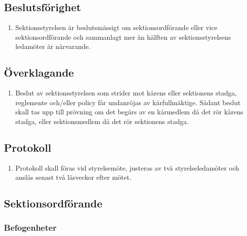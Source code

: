 \documentclass[11pt,a4paper]{article}
\begin{document}
\subsection{Beslutsförighet}

\begin{enumerate}[\thesubsection .1]

  \item  Sektionsstyrelsen är beslutsmässigt om sektionsordförande eller vice sektionsordförande och sammanlagt mer än hälften av sektionsstyrelsens ledamöter är närvarande.

\end{enumerate}

\subsection{Överklagande}

\begin{enumerate}[\thesubsection .1]

  \item Beslut av sektionsstyrelsen som strider mot kårens eller sektionens stadga, reglemente och/eller policy får undanröjas av kårfullmäktige. Sådant beslut skall tas upp till prövning om det begärs av en kårmedlem då det rör kårens stadga, eller sektionsmedlem då det rör sektionens stadga.

\end{enumerate}

\subsection{Protokoll}

\begin{enumerate}[\thesubsection .1]

  \item Protokoll skall föras vid styrelsemöte, justeras av två
  styrelseledamöter och anslås senast två läsveckor efter mötet.

\end{enumerate}



\subsection{Sektionsordförande}

\subsubsection{Befogenheter}
\end{document}
